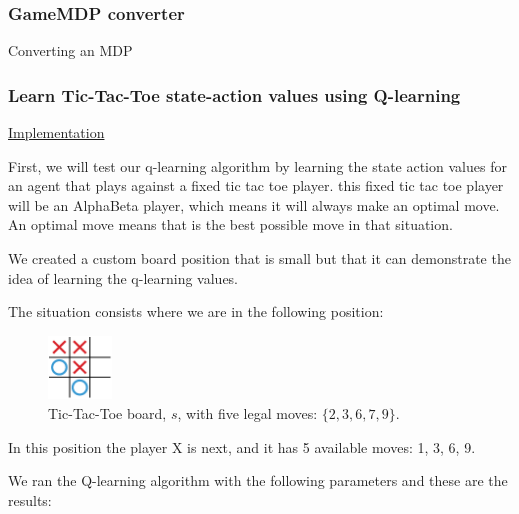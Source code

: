 \documentclass{article}
\begin{document}
\subsubsection{GameMDP converter}

Converting an MDP

\subsubsection{Learn Tic-Tac-Toe state-action values using Q-learning}


\noindent
\href{https://github.com/davidrobles/mlnd-capstone-code/blob/master/examples/tictactoe-qlearning.py}
     {Implementation}
\break

First, we will test our q-learning algorithm by learning the state action values for an agent that
plays against a fixed tic tac toe player. this fixed tic tac toe player will be an AlphaBeta player,
which means it will always make an optimal move. An optimal move means that is the best possible
move in that situation.

We created a custom board position that is small but that it can demonstrate the idea of learning
the q-learning values.

The situation consists where we are in the following position:


\begin{figure}[!h]
    \centering
    \includegraphics[width=0.15\textwidth]{figures/tic/tic-1.pdf}
    \caption{Tic-Tac-Toe board, $s$, with five legal moves: $\{2, 3, 6, 7, 9\}$.}
    \label{fig:tic-play32}
\end{figure}

In this position the player X is next, and it has 5 available moves: 1, 3, 6, 9.


We ran the Q-learning algorithm with the following parameters and these are the results:
\end{document}
